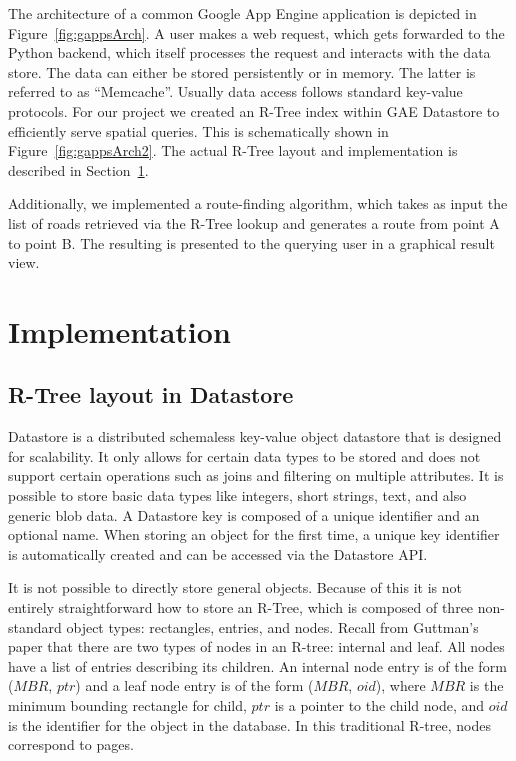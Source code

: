 \documentclass{scrartcl}
\begin{document}
The architecture of a common Google App Engine application is depicted in Figure~\ref{fig:gappsArch}. A user makes a web request, which gets forwarded to the Python backend, which itself processes the request and interacts with the data store. The data can either be stored persistently or in memory. The latter is referred to as ``Memcache''. Usually data access follows standard key-value protocols. For our project we created an R-Tree index within GAE Datastore to efficiently serve spatial queries. This is schematically shown in Figure~\ref{fig:gappsArch2}. The actual R-Tree layout and implementation is described in Section~\ref{sec:implementation}.

Additionally, we implemented a route-finding algorithm, which takes as input the list of roads retrieved via the R-Tree lookup and generates a route from point A to point B. The resulting is presented to the querying user in a graphical result view.


\section{Implementation}
\label{sec:implementation}
\subsection{R-Tree layout in Datastore}
Datastore is a distributed schemaless key-value object datastore that is designed for scalability. It only allows for certain data types to be stored and does not support certain operations such as joins and filtering on multiple attributes. It is possible to store basic data types like integers, short strings, text, and also generic blob data. A Datastore key is composed of a unique identifier and an optional name. When storing an object for the first time, a unique key identifier is automatically created and can be accessed via the Datastore API. 

It is not possible to directly store general objects. Because of this it is not entirely straightforward how to store an R-Tree, which is composed of three non-standard object types: rectangles, entries, and nodes. Recall from Guttman's paper\cite{DBLP:conf/sigmod/Guttman84} that there are two types of nodes in an R-tree: internal and leaf. All nodes have a list of entries describing its children. An internal node entry is of the form ($MBR$, $ptr$) and a leaf node entry is of the form ($MBR$, $oid$), where $MBR$ is the minimum bounding rectangle for child, $ptr$ is a pointer to the child node, and $oid$ is the identifier for the object in the database. In this traditional R-tree, nodes correspond to pages.
\end{document}
